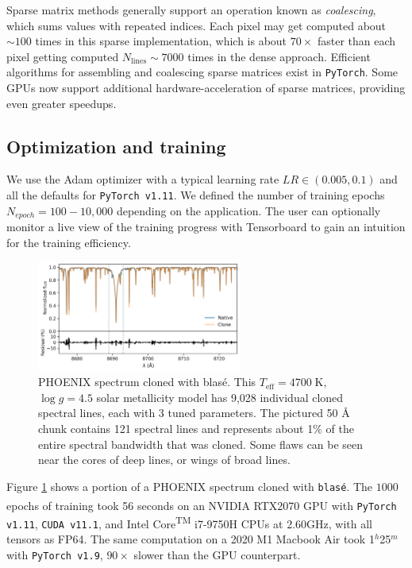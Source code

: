 \documentclass[twocolumn]{aastex631}
\begin{document}
Sparse matrix methods generally support an operation known as \emph{coalescing}, which sums values with repeated indices. Each pixel may get computed about $\sim100$ times in this sparse implementation, which is about $70\times$ faster than each pixel getting computed $N_\mathrm{lines}\sim7000$ times in the dense approach.  Efficient algorithms for assembling and coalescing sparse matrices exist in \texttt{PyTorch}.  Some GPUs now support additional hardware-acceleration of sparse matrices, providing even greater speedups.



\subsection{Optimization and training}

We use the Adam optimizer \citep{2014arXiv1412.6980K} with a typical learning rate $LR\in (0.005, 0.1)$ and all the defaults for \texttt{PyTorch v1.11}.  We defined the number of training epochs $N_{epoch}=100-10,000$ depending on the application. The user can optionally monitor a live view of the training progress with Tensorboard \citep{tensorflow2015-whitepaper} to gain an intuition for the training efficiency.


\begin{figure}[hbt!]
    \centering
    \includegraphics[width=0.6\textwidth]{figures/blase_clone_demo.png}
    \caption{PHOENIX spectrum cloned with blas\'e.  This $T_{\mathrm{eff}}=4700\;$K,  $\log{g}=4.5$ solar metallicity model has 9,028 individual cloned spectral lines, each with 3 tuned parameters.  The pictured 50 \AA~ chunk contains 121 spectral lines and represents about 1$\%$ of the entire spectral bandwidth that was cloned.  Some flaws can be seen near the cores of deep lines, or wings of broad lines.}
    \label{fig_cloned_spectrum_demo}
\end{figure}


Figure \ref{fig_cloned_spectrum_demo} shows a portion of a PHOENIX spectrum cloned with \texttt{blas\'e}. The $1000$ epochs of training took 56 seconds on an NVIDIA\textsuperscript{\tiny\textregistered} RTX2070 GPU with \texttt{PyTorch v1.11}, \texttt{CUDA v11.1}, and Intel\textsuperscript{\tiny\textregistered} Core\textsuperscript{\tiny TM} i7-9750H CPUs at 2.60GHz, with all tensors as FP64. The same computation on a 2020 M1 Macbook Air took 1$^h$25$^m$ with \texttt{PyTorch v1.9}, $90\times$ slower than the GPU counterpart.
\end{document}
